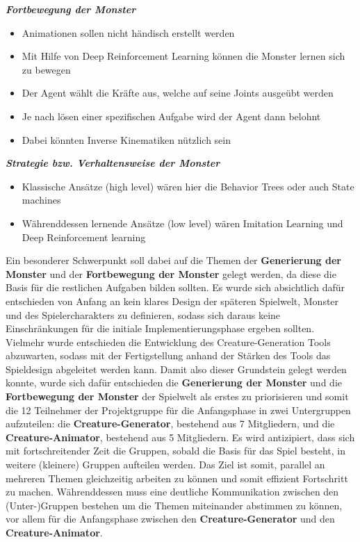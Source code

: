 \textbf{\textit{Fortbewegung der Monster}}
\begin{itemize}
	\item Animationen sollen nicht händisch erstellt werden
	\item Mit Hilfe von Deep Reinforcement Learning können die Monster lernen sich zu bewegen
	\item Der Agent wählt die Kräfte aus, welche auf seine Joints ausgeübt werden
	\item Je nach lösen einer spezifischen Aufgabe wird der Agent dann belohnt
	\item Dabei könnten Inverse Kinematiken nützlich sein
\end{itemize}
\textbf{\textit{Strategie bzw. Verhaltensweise der Monster}}
\begin{itemize}
	\item Klassische Ansätze (high level) wären hier die Behavior Trees oder auch State machines
	\item Währenddessen lernende Ansätze (low level) wären Imitation Learning und Deep Reinforcement learning
\end{itemize}

Ein besonderer Schwerpunkt soll dabei auf die Themen der \textbf{Generierung der Monster} und der \textbf{Fortbewegung der Monster} gelegt werden, da diese die Basis für die restlichen Aufgaben bilden sollten. Es wurde sich absichtlich dafür entschieden von Anfang an kein klares Design der späteren Spielwelt, Monster und des Spielercharakters zu definieren, sodass sich daraus keine Einschränkungen für die initiale Implementierungsphase ergeben sollten. Vielmehr wurde entschieden die Entwicklung des Creature-Generation Tools abzuwarten, sodass mit der Fertigstellung anhand der Stärken des Tools das Spieldesign abgeleitet werden kann. Damit also dieser Grundstein gelegt werden konnte, wurde sich dafür entschieden die \textbf{Generierung der Monster} und die \textbf{Fortbewegung der Monster} der Spielwelt als erstes zu priorisieren und somit die 12 Teilnehmer der Projektgruppe für die Anfangsphase in zwei Untergruppen aufzuteilen: die \textbf{Creature-Generator}, bestehend aus 7 Mitgliedern, und die \textbf{Creature-Animator}, bestehend aus 5 Mitgliedern. Es wird antizipiert, dass sich mit fortschreitender Zeit die Gruppen, sobald die Basis für das Spiel besteht, in weitere (kleinere) Gruppen aufteilen werden. Das Ziel ist somit, parallel an mehreren Themen gleichzeitig arbeiten zu können und somit effizient Fortschritt zu machen. Währenddessen muss eine deutliche Kommunikation zwischen den (Unter-)Gruppen bestehen um die Themen miteinander abstimmen zu können, vor allem für die Anfangsphase zwischen den \textbf{Creature-Generator} und den \textbf{Creature-Animator}.


